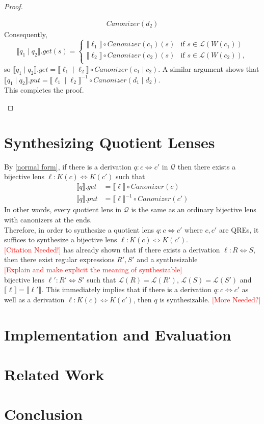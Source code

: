 \documentclass{svproc}
\newcommand{\sep}{\ensuremath{\; | \;}}
\begin{document}
\begin{proof}
\begin{enumerate}
\begin{align*}
Canonizer(d_2)
\end{align*}
Consequently,
$$
  \llbracket q_1 \sep q_2 \rrbracket.get(s) = 
  \begin{cases}
  \llbracket \ell_1 \rrbracket \circ
Canonizer(c_1) (s) & \text{if } s \in \mathcal{L}(W(c_1))\\
  \llbracket \ell_2 \rrbracket \circ
Canonizer(c_2) (s) & \text{if } s \in \mathcal{L}(W(c_2)),\\
  \end{cases}$$
  so $\llbracket q_1 \sep q_2 \rrbracket.get = \llbracket \ell_1 \sep
  \ell_2 \rrbracket \circ Canonizer(c_1 \sep c_2)$. A similar argument shows
  that $\llbracket q_1 \sep q_2 \rrbracket.put = \llbracket \ell_1 \sep
  \ell_2 \rrbracket^{-1} \circ Canonizer(d_1 \sep d_2)$.\\
  This completes the proof.
\end{enumerate}
\end{proof}
\section{Synthesizing Quotient Lenses}
By \cref{normal form}, if there is a derivation $q : c \Leftrightarrow c'$ in
$\mathcal{Q}$ then there exists a bijective lens $\ell : K(c) \Leftrightarrow
K(c')$ such that
\begin{align*}
\llbracket q \rrbracket.get &= \llbracket \ell \rrbracket\circ Canonizer(c)\\
\llbracket q \rrbracket.put &= \llbracket \ell \rrbracket^{-1} \circ
Canonizer(c')
\end{align*}
In other words, every quotient lens in $\mathcal{Q}$ is the same as an ordinary
bijective lens with canonizers at the ends.\\
Therefore, in order to synthesize a quotient lens $q: c \Leftrightarrow c'$
where $c, c'$ are QREs, it suffices to synthesize a bijective lens $\ell : K(c)
\Leftrightarrow K(c')$.\\
\textcolor{red}{[Citation Needed!]} has already shown that if there
exists a derivation $\ell : R \Leftrightarrow S$, then there exist
regular expressions $R', S'$ and a synthesizable \\
\textcolor{red}{[Explain and make explicit the meaning
of synthesizable]} \\
bijective lens $\ell' :
R' \Leftrightarrow S'$ such that $\mathcal{L}(R) = \mathcal{L}(R')$,
$\mathcal{L}(S) = \mathcal{L}(S')$ and $\llbracket \ell \rrbracket =
\llbracket \ell' \rrbracket$. This immediately implies that if there is a
derivation $q : c \Leftrightarrow c'$ as well as a derivation $\ell : K(c)
\Leftrightarrow K(c')$, then $q$ is synthesizable.
\textcolor{red}{[More Needed?]}
\section{Implementation and Evaluation}
\section{Related Work}

\section{Conclusion}
\end{document}
